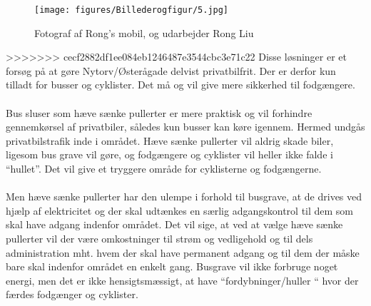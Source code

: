                                        

\begin{figure}[htbp]
  \centering
  \begin{adjustbox}{max width=\textwidth}
    \texttt{[image: figures/Billederogfigur/5.jpg]}
 \end{adjustbox}
  \caption{ Fotograf af Rong’s mobil, og udarbejder Rong Liu}
   \label{fig: Fotograf af Rong}
\end{figure}
>>>>>>> cecf2882df1ee084eb1246487e3544cbc3e71c22
Disse løsninger er et forsøg på at gøre Nytorv/Østerågade delvist privatbilfrit. Der er derfor kun tilladt for busser og cyklister. Det må og vil give mere sikkerhed til fodgængere.
~\\\\
Bus sluser som hæve sænke pullerter er mere praktisk og vil forhindre gennemkørsel af privatbiler, således kun busser kan køre igennem. Hermed undgås privatbilstrafik inde i området. Hæve sænke pullerter vil aldrig skade biler, ligesom bus grave vil gøre, og fodgængere og cyklister vil heller ikke falde i “hullet”. Det vil give et tryggere område for cyklisterne og fodgængerne.
~\\\\
Men hæve sænke pullerter har den ulempe i forhold til busgrave, at de drives ved hjælp af elektricitet og der skal udtænkes en særlig adgangskontrol til dem som skal have adgang indenfor området. Det vil sige, at ved at vælge hæve sænke pullerter vil der være omkostninger til strøm og vedligehold og til dels administration mht. hvem der skal have permanent adgang og til dem der måske bare skal indenfor området en enkelt gang. Busgrave vil ikke forbruge noget energi, men det er ikke hensigtsmæssigt, at have “fordybninger/huller “ hvor der færdes fodgænger og cyklister.

